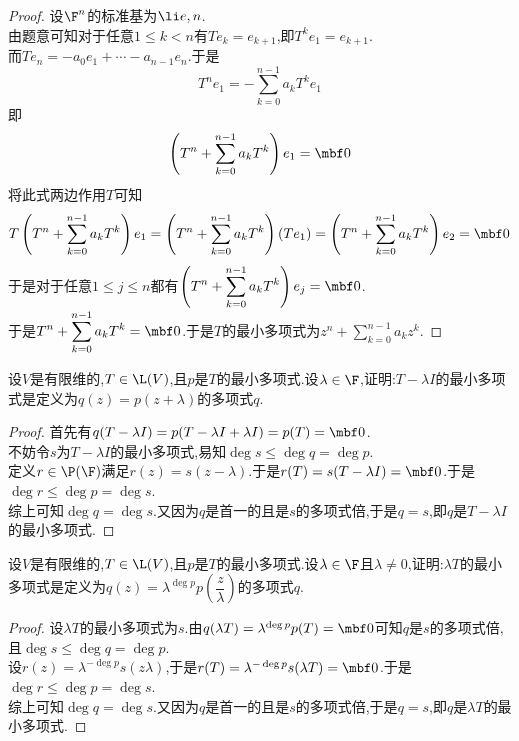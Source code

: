 \documentclass{ctexart}
\begin{document}
\begin{proof}
    设$\F^n$的标准基为$\li e,n$.\\
    由题意可知对于任意$1\leqslant k<n$有$Te_k=e_{k+1}$,即$T^{k}e_1=e_{k+1}$.\\
    而$Te_n=-a_0e_1+\cdots-a_{n-1}e_n$.于是
    \[T^{n}e_1=-\sum_{k=0}^{n-1}a_kT^ke_1\]
    即\[\left(T^n+\sum_{k=0}^{n-1}a_kT^k\right)e_1=\mbf0\]
    将此式两边作用$T$可知
    \[T\left(T^n+\sum_{k=0}^{n-1}a_kT^k\right)e_1=\left(T^n+\sum_{k=0}^{n-1}a_kT^k\right)(Te_1)=\left(T^n+\sum_{k=0}^{n-1}a_kT^k\right)e_2=\mbf0\]
    于是对于任意$1\leqslant j\leqslant n$都有$\displaystyle\left(T^n+\sum_{k=0}^{n-1}a_kT^k\right)e_j=\mbf0$.\\
    于是$\displaystyle T^n+\sum_{k=0}^{n-1}a_kT^k=\mbf0$.于是$T$的最小多项式为$\displaystyle z^n+\sum_{k=0}^{n-1}a_kz^k$.
\end{proof}
\begin{problem}[17.]
    设$V$是有限维的,$T\in\L(V)$,且$p$是$T$的最小多项式.设$\lambda\in\F$,证明:$T-\lambda I$的最小多项式是定义为$q(z)=p(z+\lambda)$的多项式$q$.
\end{problem}
\begin{proof}
    首先有$q(T-\lambda I)=p(T-\lambda I+\lambda I)=p(T)=\mbf 0$.\\
    不妨令$s$为$T-\lambda I$的最小多项式,易知$\deg s\leqslant\deg q=\deg p$.\\
    定义$r\in\P(\F)$满足$r(z)=s(z-\lambda)$.于是$r(T)=s(T-\lambda I)=\mbf0$.于是$\deg r\leqslant\deg p=\deg s$.\\
    综上可知$\deg q=\deg s$.又因为$q$是首一的且是$s$的多项式倍,于是$q=s$,即$q$是$T-\lambda I$的最小多项式.
\end{proof}
\begin{problem}[18.]
    设$V$是有限维的,$T\in\L(V)$,且$p$是$T$的最小多项式.设$\lambda\in\F$且$\lambda\neq0$,证明:$\lambda T$的最小多项式是定义为$q(z)=\lambda^{\deg p}p\left(\dfrac z\lambda\right)$的多项式$q$.
\end{problem}
\begin{proof}
    设$\lambda T$的最小多项式为$s$.由$q(\lambda T)=\lambda^{\deg p}p(T)=\mbf0$可知$q$是$s$的多项式倍,且$\deg s\leqslant\deg q=\deg p$.\\
    设$r(z)=\lambda^{-\deg p}s(z\lambda)$,于是$r(T)=\lambda^{-\deg p}s(\lambda T)=\mbf0$.于是$\deg r\leqslant\deg p=\deg s$.\\
    综上可知$\deg q=\deg s$.又因为$q$是首一的且是$s$的多项式倍,于是$q=s$,即$q$是$\lambda T$的最小多项式.
\end{proof}
\end{document}
